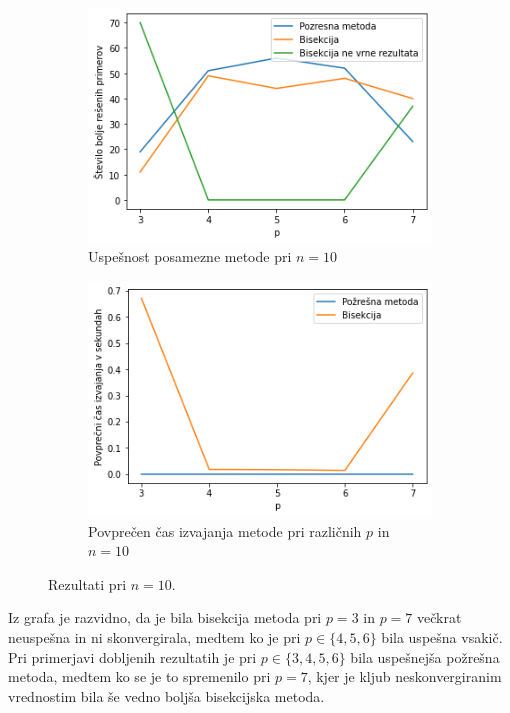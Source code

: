 \documentclass[a4paper]{article}
\begin{document}
\begin{figure}[h]
	\begin{subfigure}[t]{0.45\textwidth}
		\centering
		\includegraphics[width=\textwidth]{n_10.png}
		\caption{Uspešnost posamezne metode pri $n = 10$}
		\label{n_10_count}
	\end{subfigure}
	\hfill
	\begin{subfigure}[t]{0.45\textwidth}
		\centering
		\includegraphics[width=\textwidth]{n_10_time.png}
		\caption{Povprečen čas izvajanja metode pri različnih $p$ in $n = 10$}
		\label{n_10_time}
	\end{subfigure}
    \caption{Rezultati pri $n = 10$.}
    \label{fig:n_10}
\end{figure}


Iz grafa je razvidno, da je bila bisekcija metoda pri $p = 3$ in $p = 7$ večkrat neuspešna in ni skonvergirala, medtem ko je pri $p \in \{4, 5, 6\}$ bila uspešna vsakič. 
Pri primerjavi dobljenih rezultatih je pri $p \in \{3, 4, 5, 6\}$ bila uspešnejša požrešna metoda, medtem ko se je to spremenilo pri $p = 7$, kjer je kljub neskonvergiranim vrednostim bila še vedno boljša bisekcijska metoda. 
\end{document}
